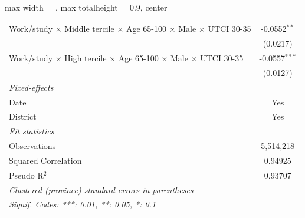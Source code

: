 \begin{table}[htbp]
\begin{adjustbox}{max width = \textwidth, max totalheight = 0.9\textheight, center}
\begin{tabular}{lc}
         Work/study $\times$ Middle tercile $\times$ Age 65-100 $\times$ Male $\times$ UTCI 30-35       & -0.0552$^{**}$\\   
                                                                                                        & (0.0217)\\   
         Work/study $\times$ High tercile $\times$ Age 65-100 $\times$ Male $\times$ UTCI 30-35         & -0.0557$^{***}$\\   
                                                                                                        & (0.0127)\\   
         \midrule
         \emph{Fixed-effects}\\
         Date                                                                                           & Yes\\  
         District                                                                                       & Yes\\  
         \midrule
         \emph{Fit statistics}\\
         Observations                                                                                   & 5,514,218\\  
         Squared Correlation                                                                            & 0.94925\\  
         Pseudo R$^2$                                                                                   & 0.93707\\  
         \midrule \midrule
         \multicolumn{2}{l}{\emph{Clustered (province) standard-errors in parentheses}}\\
         \multicolumn{2}{l}{\emph{Signif. Codes: ***: 0.01, **: 0.05, *: 0.1}}\\
      \end{tabular}
   \end{adjustbox}
\end{table}


